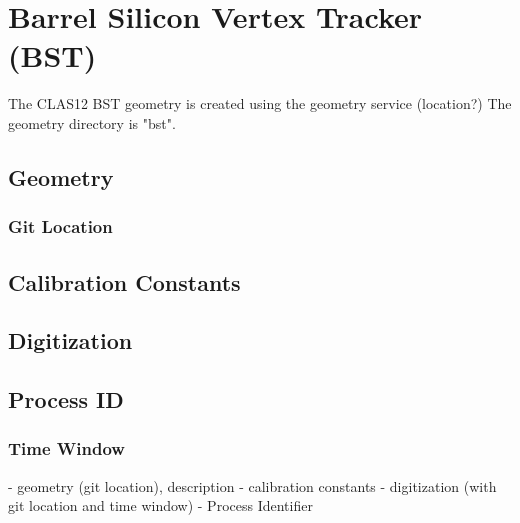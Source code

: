\section{Barrel Silicon Vertex Tracker (BST)}

The CLAS12 BST geometry is created using the geometry service (location?)
The geometry directory is "bst".


\subsection{Geometry}
\subsubsection{Git Location}
\subsection{Calibration Constants}

\subsection{Digitization}

\subsection{Process ID}

\subsubsection{Time Window}


- geometry (git location), description
- calibration constants
- digitization (with git location and time window)
- Process Identifier
